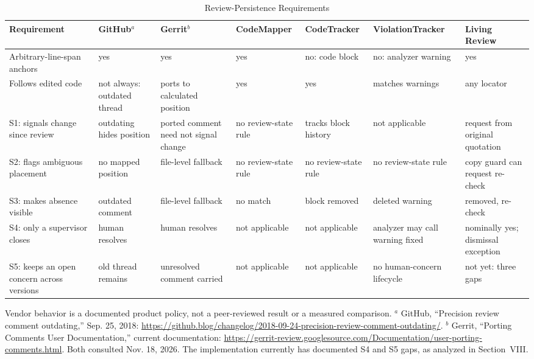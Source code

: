 \documentclass[10pt,conference,letterpaper]{IEEEtran}
\begin{document}
\begin{table}[!t]
\caption{Review-Persistence Requirements}
\label{tab:review-comparison}
\centering\scriptsize
\setlength{\tabcolsep}{3.1pt}
\renewcommand{\arraystretch}{1.12}
\begin{tabularx}{\textwidth}{>{\raggedright\arraybackslash}p{}*{6}{>{\raggedright\arraybackslash}X}}
\hline
Requirement & GitHub$^{a}$ & Gerrit$^{b}$ & CodeMapper \cite{codemapper2026} & CodeTracker \cite{blocktracking2024} & ViolationTracker \cite{violation2023} & Living Review \\
\hline
Arbitrary-line-span anchors & yes & yes & yes & no: code block & no: analyzer warning & yes \\
Follows edited code & not always: outdated thread & ports to calculated position & yes & yes & matches warnings & any locator \\
S1: signals change since review & outdating hides position & ported comment need not signal change & no review-state rule & tracks block history & not applicable & request from original quotation \\
S2: flags ambiguous placement & no mapped position & file-level fallback & no review-state rule & no review-state rule & no review-state rule & copy guard can request re-check \\
S3: makes absence visible & outdated comment & file-level fallback & no match & block removed & deleted warning & removed, re-check \\
S4: only a supervisor closes & human resolves & human resolves & not applicable & not applicable & analyzer may call warning fixed & nominally yes; dismissal exception \\
S5: keeps an open concern across versions & old thread remains & unresolved comment carried & not applicable & not applicable & no human-concern lifecycle & not yet: three gaps \\
\hline
\end{tabularx}
\vspace{2pt}
\parbox{\textwidth}{\footnotesize Vendor behavior is a documented product policy, not a peer-reviewed result or a measured comparison. $^{a}$ GitHub, “Precision review comment outdating,” Sep. 25, 2018: \url{https://github.blog/changelog/2018-09-24-precision-review-comment-outdating/}. $^{b}$ Gerrit, “Porting Comments User Documentation,” current documentation: \url{https://gerrit-review.googlesource.com/Documentation/user-porting-comments.html}. Both consulted Nov. 18, 2026. The implementation currently has documented S4 and S5 gaps, as analyzed in Section~VIII.}
\end{table}
\end{document}
